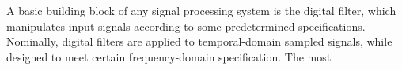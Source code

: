 A basic building block of any signal processing system is the digital filter, which manipulates input signals according to some predetermined specifications. 
Nominally, digital filters are applied to temporal-domain sampled signals, while designed to meet certain frequency-domain specification.
The most  